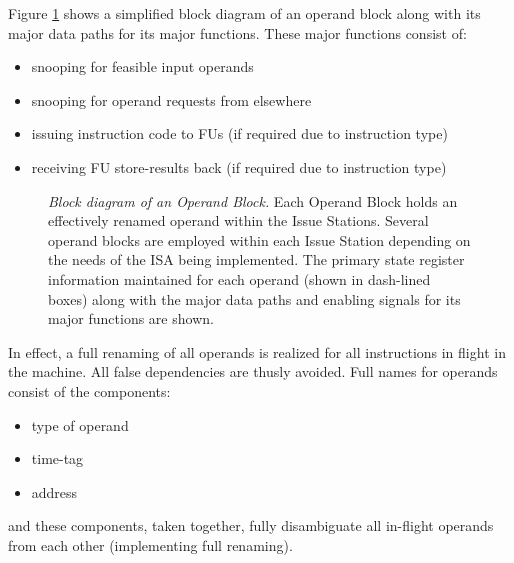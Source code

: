 \documentclass[10pt,dvips]{article}
\begin{document}
Figure \ref{fig:operand} shows a simplified block diagram of
an operand block along with its major data paths for its
major functions.  These major functions consist of:
%
\begin{itemize}
\vspace{-0.10in}
\item{snooping for feasible input operands}
\vspace{-0.10in}
\item{snooping for operand requests from elsewhere}
\vspace{-0.10in}
\item{issuing instruction code to FUs (if required due to instruction type)}
\vspace{-0.10in}
\item{receiving FU store-results back (if required due to instruction type)}
\vspace{-0.10in}
\end{itemize}   
%
%
\begin{figure}
\centering
{}
\caption{{\em Block diagram of an Operand Block.} 
\small{
Each Operand Block holds an effectively renamed 
operand within the Issue Stations.
Several operand blocks are employed within each Issue Station
depending on the needs of the ISA being implemented.
The primary state register information maintained for each operand (shown in
dash-lined boxes)
along with the major data paths and enabling signals for
its major functions are shown.
}
}
\label{fig:operand}
\end{figure}
%
In effect, a full renaming of
all operands is realized for all instructions
in flight in the machine.  
All false dependencies are thusly avoided.
Full names for operands consist of the components:
%
\begin{itemize}
\vspace{-0.10in}
\item{type of operand}
\vspace{-0.10in}
\item{time-tag}
\vspace{-0.10in}
\item{address}
\vspace{-0.10in}
\end{itemize}   
%
and these components, taken together, fully disambiguate 
all in-flight operands from each other (implementing full renaming).
%
%
\end{document}
